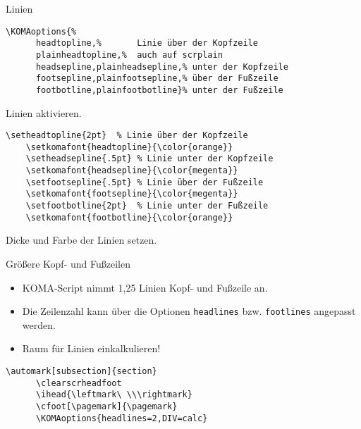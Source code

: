 \begin{Frame}[fragile]{Linien}
  \begin{lstlisting}[gobble=4]
    \KOMAoptions{%
      headtopline,%       Linie über der Kopfzeile
      plainheadtopline,%  auch auf scrplain
      headsepline,plainheadsepline,% unter der Kopfzeile
      footsepline,plainfootsepline,% über der Fußzeile
      footbotline,plainfootbotline}% unter der Fußzeile
  \end{lstlisting}
  Linien aktivieren.

  \xxx

  \begin{lstlisting}[gobble=4]
    \setheadtopline{2pt}  % Linie über der Kopfzeile
    \setkomafont{headtopline}{\color{orange}}
    \setheadsepline{.5pt} % Linie unter der Kopfzeile
    \setkomafont{headsepline}{\color{megenta}}
    \setfootsepline{.5pt} % Linie über der Fußzeile
    \setkomafont{footsepline}{\color{megenta}}
    \setfootbotline{2pt}  % Linie unter der Fußzeile
    \setkomafont{footbotline}{\color{orange}}
  \end{lstlisting}
  Dicke und Farbe der Linien setzen.
\end{Frame}

\begin{Frame}[fragile]{Größere Kopf- und Fußzeilen}
  \begin{itemize}
    \item KOMA-Script nimmt 1,25 Linien Kopf- und Fußzeile an.
    \item Die Zeilenzahl kann über die Optionen \lstinline-headlines-
      bzw. \lstinline-footlines- angepasst werden.
    \item Raum für Linien einkalkulieren!
  \end{itemize}
  
  \xxx

  \begin{Beispiel}
    \begin{lstlisting}[gobble=6,style=block]
      \automark[subsection]{section}
      \clearscrheadfoot
      \ihead{\leftmark\ \\\rightmark}
      \cfoot[\pagemark]{\pagemark}
      \KOMAoptions{headlines=2,DIV=calc}
    \end{lstlisting}
  \end{Beispiel}
\end{Frame}

